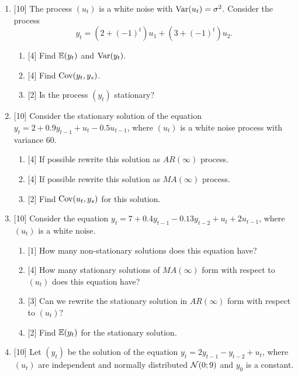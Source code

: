 \begin{enumerate}
    \item {[10]} The process $(u_t)$ is a white noise with $\operatorname{Var}(u_t) = \sigma^2$.
    Consider the process 
    \[
    y_t = (2 + (-1)^t) u_1 + (3 + (-1)^t) u_2.
    \]
    \begin{enumerate}
        \item {[4]} Find $\operatorname{\mathbb{E}}(y_t)$ and $\operatorname{Var}(y_t)$.
        \item {[4]} Find $\operatorname{Cov}(y_t, y_s)$.
        \item {[2]} Is the process $(y_t)$ stationary?
    \end{enumerate}

    \item {[10]} Consider the stationary solution of the equation 
    $y_t = 2 + 0.9 y_{t-1} + u_t - 0.5 u_{t-1}$,    
    where $(u_t)$ is a white noise process with variance $60$. 
    \begin{enumerate}
        \item {[4]} If possible rewrite this solution as $AR(\infty)$ process. 
        \item {[4]} If possible rewrite this solution as $MA(\infty)$ process. 
        \item {[2]} Find $\operatorname{Cov}(u_t, y_s)$ for this solution. 
    \end{enumerate}
    \item {[10]} Consider the equation 
    $y_t = 7 +0.4 y_{t-1} - 0.13 y_{t-2} + u_t + 2u_{t-1}$,
    where $(u_t)$ is a white noise. 

    \begin{enumerate}
        \item {[1]} How many non-stationary solutions does this equation have?
        \item {[4]} How many stationary solutions of $MA(\infty)$ form with respect to $(u_t)$ does this equation have?
        \item {[3]} Can we rewrite the stationary solution in $AR(\infty)$ form with respect to $(u_t)$?
        \item {[2]} Find $\operatorname{\mathbb{E}}(y_t)$ for the stationary solution.
    \end{enumerate}

    \item {[10]} Let $(y_t)$ be the solution of the equation 
    $y_t = 2 y_{t-1} - y_{t-2} + u_t$,
    where $(u_t)$ are independent and normally distributed $\mathcal{N}(0;9)$ and $y_0$ is a constant.


\end{enumerate}
